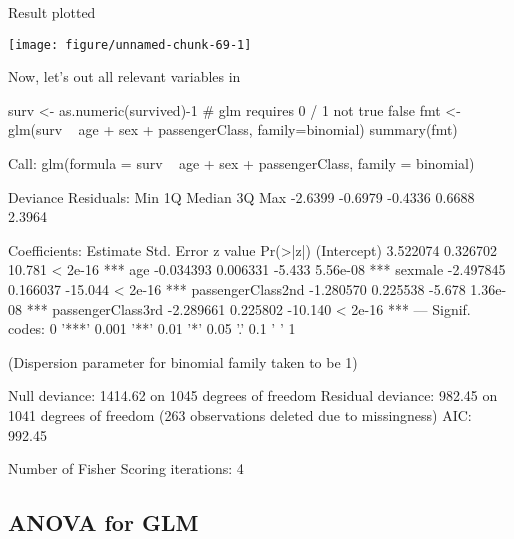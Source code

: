 \documentclass[a4paper,twoside]{tufte-book}\usepackage[]{graphicx}\usepackage[]{color}
\makeatletter
\def\maxwidth{ %
  \ifdim\Gin@nat@width>\linewidth
    \linewidth
  \else
    \Gin@nat@width
  \fi
}
\makeatother
\begin{document}
\begin{appendices}
Result plotted 

\begin{Schunk}

\texttt{[image: figure/unnamed-chunk-69-1]} \end{Schunk}

Now, let's out all relevant variables in 

\begin{Schunk}
\begin{Sinput}
surv <- as.numeric(survived)-1 # glm requires 0 / 1 not true false
fmt <- glm(surv ~ age  + sex + passengerClass, family=binomial)
summary(fmt)
\end{Sinput}
\begin{Soutput}

Call:
glm(formula = surv ~ age + sex + passengerClass, family = binomial)

Deviance Residuals: 
    Min       1Q   Median       3Q      Max  
-2.6399  -0.6979  -0.4336   0.6688   2.3964  

Coefficients:
                   Estimate Std. Error z value Pr(>|z|)    
(Intercept)        3.522074   0.326702  10.781  < 2e-16 ***
age               -0.034393   0.006331  -5.433 5.56e-08 ***
sexmale           -2.497845   0.166037 -15.044  < 2e-16 ***
passengerClass2nd -1.280570   0.225538  -5.678 1.36e-08 ***
passengerClass3rd -2.289661   0.225802 -10.140  < 2e-16 ***
---
Signif. codes:  0 '***' 0.001 '**' 0.01 '*' 0.05 '.' 0.1 ' ' 1

(Dispersion parameter for binomial family taken to be 1)

    Null deviance: 1414.62  on 1045  degrees of freedom
Residual deviance:  982.45  on 1041  degrees of freedom
  (263 observations deleted due to missingness)
AIC: 992.45

Number of Fisher Scoring iterations: 4
\end{Soutput}
\end{Schunk}

\subsection{ANOVA for GLM}


\end{appendices}
\end{document}
